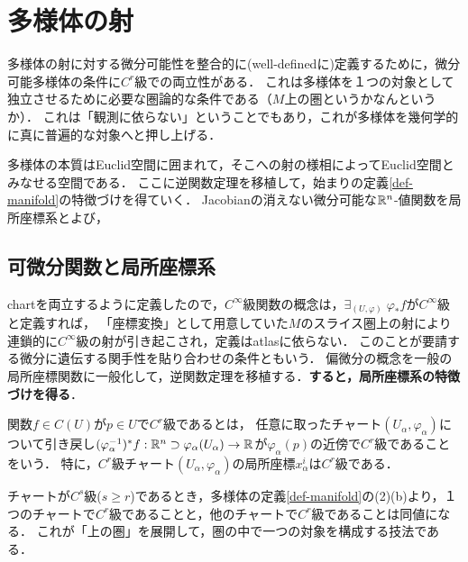 \documentclass[uplatex,dvipdfmx]{jsreport}
\begin{document}
\section{多様体の射}

\begin{tcolorbox}[colframe=ForestGreen, colback=ForestGreen!10!white,breakable,colbacktitle=ForestGreen!40!white,coltitle=black,fonttitle=\bfseries\sffamily,
title=]
    多様体の射に対する微分可能性を整合的に(well-definedに)定義するために，微分可能多様体の条件に$C^r$級での両立性がある．
    これは多様体を１つの対象として独立させるために必要な圏論的な条件である（$M$上の圏というかなんというか）．
    これは「観測に依らない」ということでもあり，これが多様体を幾何学的に真に普遍的な対象へと押し上げる．

    多様体の本質はEuclid空間に囲まれて，そこへの射の様相によってEuclid空間とみなせる空間である．
    ここに逆関数定理を移植して，始まりの定義\ref{def-manifold}の特徴づけを得ていく．
    Jacobianの消えない微分可能な$\mathbb{R}^n$-値関数を局所座標系とよび，
\end{tcolorbox}

\subsection{可微分関数と局所座標系}

\begin{tcolorbox}[colframe=ForestGreen, colback=ForestGreen!10!white,breakable,colbacktitle=ForestGreen!40!white,coltitle=black,fonttitle=\bfseries\sffamily,
title=可微分関数と局所座標系とは形式的には違いのない概念である，という認識が大事．]
    chartを両立するように定義したので，$C^\infty$級関数の概念は，$\exists_{(U,\varphi)}\;\varphi_*f$が$C^\infty$級と定義すれば，
    「座標変換」として用意していた$M$のスライス圏上の射により連鎖的に$C^\infty$級の射が引き起こされ，定義はatlasに依らない．
    このことが要請する微分に遺伝する関手性を貼り合わせの条件ともいう．
    偏微分の概念を一般の局所座標関数に一般化して，逆関数定理を移植する．\textbf{すると，局所座標系の特徴づけを得る}．
\end{tcolorbox}

\begin{definition}
    関数$f\in C(U)$が$p\in U$で$C^r$級であるとは，
    任意に取ったチャート$(U_\alpha,\varphi_\alpha)$について引き戻し$(\varphi_\alpha^{-1})^*f:\mathbb{R}^n\supset\varphi_\alpha(U_\alpha)\to\mathbb{R}$が$\varphi_\alpha(p)$の近傍で$C^r$級であることをいう．
    特に，$C^r$級チャート$(U_\alpha,\varphi_\alpha)$の局所座標$x_\alpha^i$は$C^r$級である．
\end{definition}
\begin{remark}
    チャートが$C^s$級($s\ge r$)であるとき，多様体の定義\ref{def-manifold}の(2)(b)より，１つのチャートで$C^r$級であることと，他のチャートで$C^r$級であることは同値になる．
    これが「上の圏」を展開して，圏の中で一つの対象を構成する技法である．
\end{remark}
\end{document}
